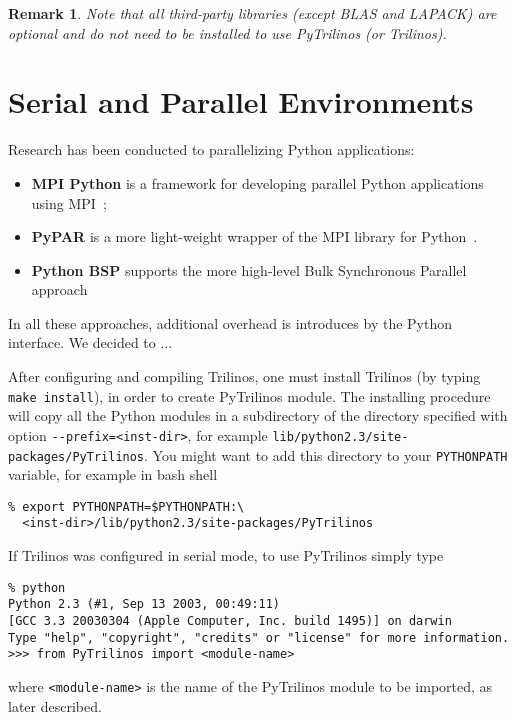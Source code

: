 \documentclass[10pt,relax]{SANDreport}
\newtheorem{remark}{Remark}
\begin{document}
\begin{remark}
Note that all third-party libraries (except BLAS and LAPACK) are optional and
do not need to be installed to use PyTrilinos (or Trilinos).
\end{remark}

\section{Serial and Parallel Environments}
\label{sec:serial}

Research has been conducted to parallelizing Python applications: 
\begin{itemize}
\item {\bf MPI Python} is a framework for developing parallel Python
applications using MPI~\cite{MPI-Python};
\item {\bf PyPAR}  is a more light-weight wrapper of the MPI library for
Python~\cite{pypar}.
\item {\bf Python BSP} supports the more high-level Bulk Synchronous Parallel
approach~\cite{FIXME}
\end{itemize}

In all these approaches, additional overhead is introduces by the Python
interface. We decided to ...



After configuring and compiling Trilinos, one must install Trilinos 
(by typing \verb!make install!), in order to create PyTrilinos module.
The installing procedure will copy all the Python modules in a subdirectory of
the directory specified with option \verb!--prefix=<inst-dir>!, for example
\verb!lib/python2.3/site-packages/PyTrilinos!. You might want to add this
directory to your \verb!PYTHONPATH! variable, for example in bash shell
\begin{verbatim}
% export PYTHONPATH=$PYTHONPATH:\
  <inst-dir>/lib/python2.3/site-packages/PyTrilinos
\end{verbatim}

If Trilinos was configured in serial mode, to use PyTrilinos  simply type
\begin{verbatim}
% python
Python 2.3 (#1, Sep 13 2003, 00:49:11) 
[GCC 3.3 20030304 (Apple Computer, Inc. build 1495)] on darwin
Type "help", "copyright", "credits" or "license" for more information.
>>> from PyTrilinos import <module-name>
\end{verbatim}
where \verb!<module-name>! is the name of the PyTrilinos module to be
imported, as later described.
\end{document}
